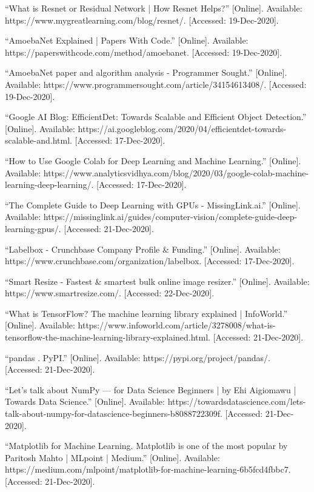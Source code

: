 \documentclass[12pt]{report}
\begin{document}
\begin{thebibliography}{1}
“What is Resnet or Residual Network | How Resnet Helps?” [Online]. Available: https://www.mygreatlearning.com/blog/resnet/. [Accessed: 19-Dec-2020].

“AmoebaNet Explained | Papers With Code.” [Online]. Available: https://paperswithcode.com/method/amoebanet. [Accessed: 19-Dec-2020].

“AmoebaNet paper and algorithm analysis - Programmer Sought.” [Online]. Available: https://www.programmersought.com/article/34154613408/. [Accessed: 19-Dec-2020].

“Google AI Blog: EfficientDet: Towards Scalable and Efficient Object Detection.” [Online]. Available: https://ai.googleblog.com/2020/04/efficientdet-towards-scalable-and.html. [Accessed: 17-Dec-2020].


“How to Use Google Colab for Deep Learning and Machine Learning.” [Online]. Available: https://www.analyticsvidhya.com/blog/2020/03/google-colab-machine-learning-deep-learning/. [Accessed: 17-Dec-2020].

“The Complete Guide to Deep Learning with GPUs - MissingLink.ai.” [Online]. Available: https://missinglink.ai/guides/computer-vision/complete-guide-deep-learning-gpus/. [Accessed: 21-Dec-2020].

“Labelbox - Crunchbase Company Profile \& Funding.” [Online]. Available: https://www.crunchbase.com/organization/labelbox. [Accessed: 17-Dec-2020].

“Smart Resize - Fastest \& smartest bulk online image resizer.” [Online]. Available: https://www.smartresize.com/. [Accessed: 22-Dec-2020].

“What is TensorFlow? The machine learning library explained | InfoWorld.” [Online]. Available: https://www.infoworld.com/article/3278008/what-is-tensorflow-the-machine-learning-library-explained.html. [Accessed: 21-Dec-2020].

“pandas . PyPI.” [Online]. Available: https://pypi.org/project/pandas/. [Accessed: 21-Dec-2020].

“Let’s talk about NumPy — for Data Science Beginners | by Ehi Aigiomawu | Towards Data Science.” [Online]. Available: https://towardsdatascience.com/lets-talk-about-numpy-for-datascience-beginners-b8088722309f. [Accessed: 21-Dec-2020].

“Matplotlib for Machine Learning. Matplotlib is one of the most popular by Paritosh Mahto | MLpoint | Medium.” [Online]. Available: https://medium.com/mlpoint/matplotlib-for-machine-learning-6b5fcd4fbbc7. [Accessed: 21-Dec-2020].


\end{thebibliography}
\end{document}
